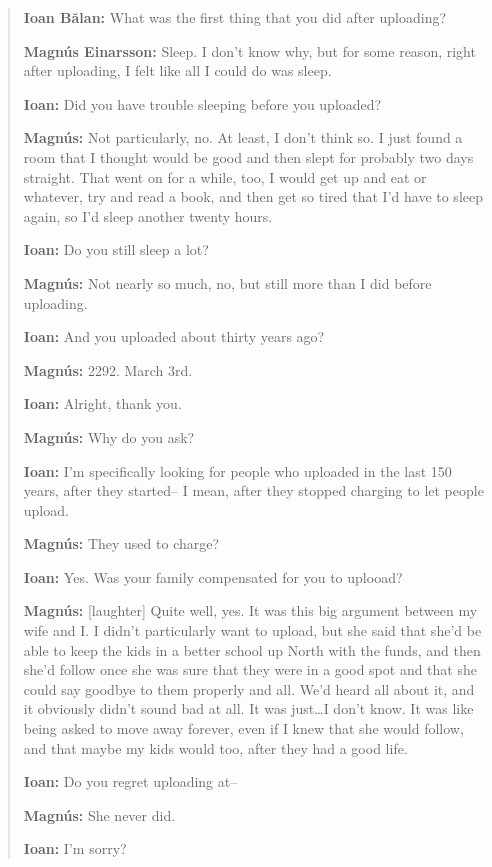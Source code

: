 \begin{quote}
\textbf{Ioan Bălan:} What was the first thing that you did after uploading?

\textbf{Magnús Einarsson:} Sleep. I don't know why, but for some reason, right after uploading, I felt like all I could do was sleep.

\textbf{Ioan:} Did you have trouble sleeping before you uploaded?

\textbf{Magnús:} Not particularly, no. At least, I don't think so. I just found a room that I thought would be good and then slept for probably two days straight. That went on for a while, too, I would get up and eat or whatever, try and read a book, and then get so tired that I'd have to sleep again, so I'd sleep another twenty hours.

\textbf{Ioan:} Do you still sleep a lot?

\textbf{Magnús:} Not nearly so much, no, but still more than I did before uploading.

\textbf{Ioan:} And you uploaded about thirty years ago?

\textbf{Magnús:} 2292. March 3rd.

\textbf{Ioan:} Alright, thank you.

\textbf{Magnús:} Why do you ask?

\textbf{Ioan:} I'm specifically looking for people who uploaded in the last 150 years, after they started-- I mean, after they stopped charging to let people upload.

\textbf{Magnús:} They used to charge?

\textbf{Ioan:} Yes. Was your family compensated for you to uplooad?

\textbf{Magnús:} {[}laughter{]} Quite well, yes. It was this big argument between my wife and I. I didn't particularly want to upload, but she said that she'd be able to keep the kids in a better school up North with the funds, and then she'd follow once she was sure that they were in a good spot and that she could say goodbye to them properly and all. We'd heard all about it, and it obviously didn't sound bad at all. It was just\ldots I don't know. It was like being asked to move away forever, even if I knew that she would follow, and that maybe my kids would too, after they had a good life.

\textbf{Ioan:} Do you regret uploading at--

\textbf{Magnús:} She never did.

\textbf{Ioan:} I'm sorry?


\end{quote}
